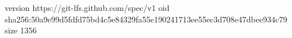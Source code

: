 version https://git-lfs.github.com/spec/v1
oid sha256:50a9e99d5fdfd75bd4c5e84329fa55e190241713ee55ec3d708e47dbee934c79
size 1356
